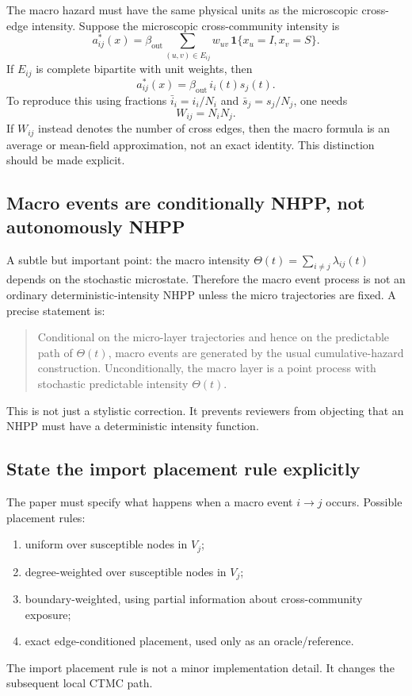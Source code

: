\documentclass[12pt,a4paper]{article}
\theoremstyle{definition}
\newcommand{\1}{\mathbf{1}}
\begin{document}
The macro hazard must have the same physical units as the microscopic cross-edge intensity.  Suppose the microscopic cross-community intensity is
\begin{equation}
    a_{ij}^*(x)=\beta_{\mathrm{out}}\sum_{(u,v)\in E_{ij}} w_{uv}\,\1\{x_u=I,x_v=S\}.
\end{equation}
If $E_{ij}$ is complete bipartite with unit weights, then
\begin{equation}
    a_{ij}^*(x)=\beta_{\mathrm{out}}\,i_i(t)s_j(t).
\end{equation}
To reproduce this using fractions $\bar i_i=i_i/N_i$ and $\bar s_j=s_j/N_j$, one needs
\begin{equation}
    W_{ij}=N_iN_j.
\end{equation}
If $W_{ij}$ instead denotes the number of cross edges, then the macro formula is an average or mean-field approximation, not an exact identity.  This distinction should be made explicit.

\subsection{Macro events are conditionally NHPP, not autonomously NHPP}

A subtle but important point: the macro intensity $\Theta(t)=\sum_{i\ne j}\lambda_{ij}(t)$ depends on the stochastic microstate.  Therefore the macro event process is not an ordinary deterministic-intensity NHPP unless the micro trajectories are fixed.  A precise statement is:

\begin{quote}
Conditional on the micro-layer trajectories and hence on the predictable path of $\Theta(t)$, macro events are generated by the usual cumulative-hazard construction.  Unconditionally, the macro layer is a point process with stochastic predictable intensity $\Theta(t)$.
\end{quote}

This is not just a stylistic correction.  It prevents reviewers from objecting that an NHPP must have a deterministic intensity function.

\subsection{State the import placement rule explicitly}

The paper must specify what happens when a macro event $i\to j$ occurs.  Possible placement rules:
\begin{enumerate}
    \item uniform over susceptible nodes in $V_j$;
    \item degree-weighted over susceptible nodes in $V_j$;
    \item boundary-weighted, using partial information about cross-community exposure;
    \item exact edge-conditioned placement, used only as an oracle/reference.
\end{enumerate}
The import placement rule is not a minor implementation detail.  It changes the subsequent local CTMC path.
\end{document}
